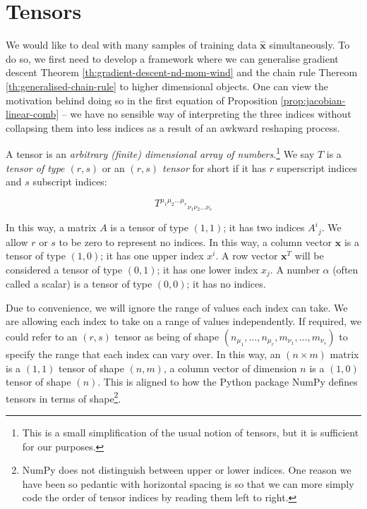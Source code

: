 \documentclass[a4paper]{article}
\theoremstyle{plain} %
\theoremstyle{definition} %
\numberwithin{equation}{subsection}
\newcommand{\vx}{{\textbf{x}}}
\newcommand{\vxh}{{\widehat{\textbf{x}}}}
\begin{document}
\section{Tensors} \label{sec:tensors}

We would like to deal with many samples of training data $\vxh$ simultaneously. 
To do so, we first need to develop a framework where we can generalise gradient descent 
Theorem \ref{th:gradient-descent-nd-mom-wind} and the chain rule Thereom \ref{th:generalised-chain-rule} 
to higher dimensional objects. One can view the motivation behind doing so in the first equation of 
Proposition \ref{prop:jacobian-linear-comb} -- we have no sensible way of interpreting the three indices 
without collapsing them into less indices as a result of an awkward reshaping process.

A tensor is an \emph{arbitrary (finite) dimensional array of numbers}.\footnote{This is a small simplification of the usual notion of tensors, but it is sufficient for our purposes.}
We say $T$ is a \emph{tensor of type $(r,s)$} or an \emph{$(r,s)$ tensor} for short if it has $r$ superscript indices and $s$ subscript indices:

\[ {T^{\mu_1 \mu_2 \dots \mu_r}}_{\nu_1 \nu_2 \dots \nu_s}\]

In this way, a matrix $A$ is a tensor of type $(1,1)$; it has two indices ${A^i}_j$. We allow $r$ or $s$ to be zero to represent no indices. 
In this way, a column vector $\vx$ is a tensor of type $(1,0)$; it has one upper index $x^i$. 
A row vector $\vx^T$ will be considered a tensor of type $(0,1)$; it has one lower index $x_j$. 
A number $\alpha$ (often called a scalar) is a tensor of type $(0,0)$; it has no indices.

Due to convenience, we will ignore the range of values each index can take. 
We are allowing each index to take on a range of values independently.
If required, we could refer to an $(r,s)$ tensor as being of shape $(n_{\mu_1}, \dots, n_{\mu_r}, m_{\nu_1}, \dots, m_{\nu_s})$ to specify the range that each index can vary over.
In this way, an $(n\times m)$ matrix is a $(1,1)$ tensor of shape $(n,m)$, a column vector of dimension $n$ is a $(1,0)$ tensor of shape $(n)$. 
This is aligned to how the Python package NumPy defines tensors in terms of shape\footnote{NumPy does not distinguish between upper or lower indices. One reason we have been so pedantic with horizontal spacing is so that we can more simply code the order of tensor indices by reading them left to right.}.
\end{document}
